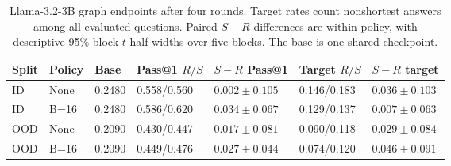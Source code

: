 \begin{table}[H]
\caption{Llama-3.2-3B graph endpoints after four rounds. Target rates count nonshortest answers among all evaluated questions. Paired $S-R$ differences are within policy, with descriptive 95\% block-$t$ half-widths over five blocks. The base is one shared checkpoint.}
\label{tab:llama-endpoints}
\centering\small\setlength{\tabcolsep}{3pt}
\begin{tabular}{@{}lllllll@{}}
\toprule
Split & Policy & Base & Pass@1 $R/S$ & $S-R$ Pass@1 & Target $R/S$ & $S-R$ target\\
\midrule
ID & None & 0.2480 & 0.558/0.560 & $0.002\pm0.105$ & 0.146/0.183 & $0.036\pm0.103$\\
ID & B=16 & 0.2480 & 0.586/0.620 & $0.034\pm0.067$ & 0.129/0.137 & $0.007\pm0.063$\\
OOD & None & 0.2090 & 0.430/0.447 & $0.017\pm0.081$ & 0.090/0.118 & $0.029\pm0.084$\\
OOD & B=16 & 0.2090 & 0.449/0.476 & $0.027\pm0.044$ & 0.074/0.120 & $0.046\pm0.091$\\
\bottomrule
\end{tabular}
\end{table}

